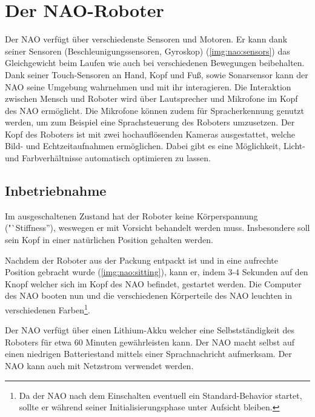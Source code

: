 \chapter{Der NAO-Roboter}

    Der NAO verfügt über verschiedenste Sensoren und Motoren.
    Er kann dank seiner Sensoren (Beschleunigungssensoren, Gyroskop)
    (\autoref{img:nao:sensors}) das Gleichgewicht
    beim Laufen wie auch bei verschiedenen Bewegungen beibehalten.
    Dank seiner Touch-Sensoren an Hand, Kopf und Fuß, sowie Sonarsensor kann der
    NAO seine Umgebung wahrnehmen und mit ihr interagieren.
    Die Interaktion zwischen Mensch und Roboter wird über Lautsprecher und
    Mikrofone im Kopf des NAO ermöglicht.
    Die Mikrofone können zudem für Spracherkennung genutzt werden, um zum
    Beispiel eine Sprachsteuerung des Roboters umzusetzen.
    Der Kopf des Roboters ist mit zwei hochauflösenden Kameras ausgestattet,
    welche Bild- und Echtzeitaufnahmen ermöglichen.
    Dabei gibt es eine Möglichkeit, Licht- und Farbverhältnisse automatisch
    optimieren zu lassen.

    \section{Inbetriebnahme}

        Im ausgeschaltenen Zustand hat der Roboter keine Körperspannung
        ("`Stiffness''), weswegen er mit Vorsicht behandelt werden muss.
        Insbesondere soll sein Kopf in einer natürlichen Position gehalten
        werden.

        Nachdem der Roboter aus der Packung entpackt ist und in eine aufrechte
        Position gebracht wurde (\autoref{img:nao:sitting}), kann er, indem 3-4
        Sekunden auf den Knopf welcher sich im Kopf des NAO befindet, gestartet
        werden.
        Die Computer des NAO booten nun und die verschiedenen Körperteile des
        NAO leuchten in verschiedenen Farben\footnote{
            Da der NAO nach dem Einschalten eventuell ein Standard-Behavior
            startet, sollte er während seiner Initialisierungsphase unter
            Aufsicht bleiben.
        }.

        Der NAO verfügt über einen Lithium-Akku welcher eine Selbstständigkeit
        des Roboters für etwa 60 Minuten gewährleisten kann.
        Der NAO macht selbst auf einen niedrigen Batteriestand mittels einer
        Sprachnachricht aufmerksam. Der NAO kann auch mit Netzstrom verwendet
        werden.

